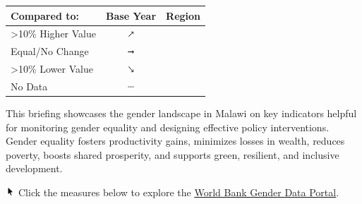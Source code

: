 \documentclass[
]{article}
\author{}
\date{\vspace{-2.5em}}
\begin{document}

\begin{table}\begingroup\fontsize{8}{10}\selectfont

\begin{tabular}[t]{lcl}

\textbf{Compared to:} & \textbf{Base Year} & \textbf{Region}\\
\midrule
>10\% Higher Value & \includegraphics[width=0.1in, height=0.1in]{upicon.png} & \cellcolor[HTML]{21908C}{}\\
Equal/No Change & \includegraphics[width=0.1in, height=0.1in]{righticon.png} & \cellcolor[HTML]{34608D}{}\\
>10\% Lower Value & \includegraphics[width=0.1in, height=0.1in]{downicon.png} & \cellcolor[HTML]{482576}{}\\
No Data & \includegraphics[width=0.1in, height=0.1in]{naicon.png} & \cellcolor{gray}{}\\

\end{tabular}
\endgroup{}\end{table}

\begin{minipage}[t][1.7cm][t]{12cm}
\fontsize{9}{8}\selectfont\raggedright
This briefing showcases the gender landscape in Malawi on key indicators helpful for monitoring gender equality and designing effective policy interventions. Gender equality fosters productivity gains, minimizes losses in wealth, reduces poverty, boosts shared prosperity, and supports green, resilient, and inclusive development. 

\includegraphics[width=10pt]{pointer.png} Click the measures below to explore the \underline{\href{https://genderdata.worldbank.org/}{World Bank Gender Data Portal}}.
\end{minipage}
\vspace{6pt}
\end{document}

